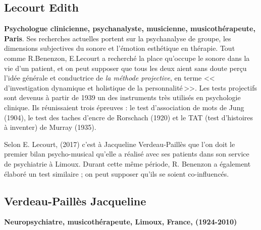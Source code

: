         \subsection{Lecourt Edith}
      \textbf{Psychologue clinicienne,
          psychanalyste, musicienne, musicothérapeute, Paris}. Ses recherches
        actuelles portent sur la psychanalyse de groupe, les
        dimensions subjectives du sonore  et l'émotion esthétique en thérapie.
   Tout comme R.Benenzon, E.Lecourt a recherché  la place qu'occupe le sonore dans la vie d'un 
        patient, et on peut supposer que tous les deux aient sans doute perçu l'idée générale et 
        conductrice de \emph{la méthode projective}, 
        en terme 
	    <<\,d'investigation dynamique et holistique de la
            personnalité\,>>.
            Les tests projectifs sont devenus à partir
        de 1939 un des instruments très utilisés en psychologie
        clinique. Ils réunissaient trois épreuves : le test
        d'association de mots de Jung (1904), le test des taches
        d'encre de Rorschach (1920) et le TAT (test d'histoires à
        inventer) de Murray (1935)\autocite[ch.~1, p.~13]{anzieu.chabert:methodes}.

        Selon E. Lecourt,
(2017)\autocite[ch.~3, p.~84]{Les arts-thérapies,Ed.Armand-Colin}
c'est à Jacqueline Verdeau-Paillès que l'on doit le premier bilan
psycho-musical qu'elle a réalisé avec ses patients dans son service
de psychiatrie à Limoux. Durant cette même période, R.
Benenzon a également élaboré un test similaire \autocite{benenzon:musicotherapie}; on peut supposer qu'ils se soient co-influencés. 


	


\subsection{Verdeau-Paillès Jacqueline
}
\textbf{Neuropsychiatre,
  musicothérapeute, Limoux, France, (1924-2010)}

